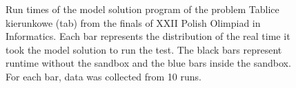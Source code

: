 \documentclass[en]{pracamgr}
\begin{document}
\begin{appendices}
\begin{figure}[H]
\caption{Run times of the model solution program of the problem Tablice kierunkowe (tab) from the finals of XXII Polish Olimpiad in Informatics. Each bar represents the distribution of the real time it took the model solution to run the test. The black bars represent runtime without the sandbox and the blue bars inside the sandbox. For each bar, data was collected from 10 runs.}
\label{figure:tab_model_solution_real_time}
\end{figure}


\end{appendices}
\end{document}
